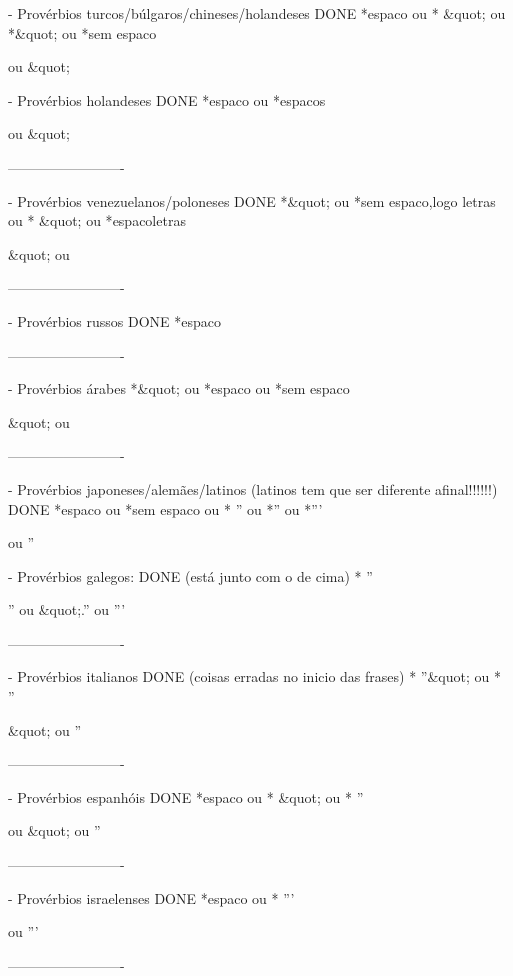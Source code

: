 - Provérbios turcos/búlgaros/chineses/holandeses                DONE
*{espaco} ou * &quot; ou *&quot; ou *{sem espaco}

\n ou &quot;

- Provérbios holandeses                                         DONE
*{espaco} ou *{espacos}

\n ou &quot;


-------------------------


- Provérbios venezuelanos/poloneses                                       DONE
*&quot; ou *{sem espaco,logo letras} ou * &quot; ou *{espaco}{letras}

&quot; ou \n


-------------------------


- Provérbios russos                                                      DONE
*{espaco}

\n


-------------------------


- Provérbios árabes
*&quot; ou *{espaco} ou *{sem espaco}

&quot; ou \n


-------------------------


- Provérbios japoneses/alemães/latinos (latinos tem que ser diferente afinal!!!!!!)        DONE
*{espaco} ou *{sem espaco} ou * '' ou *'' ou *'''

\n ou ''\n

- Provérbios galegos:                                                    DONE (está junto com o de cima)
* ''

'' ou &quot;.'' ou '''


-------------------------


- Provérbios italianos                                                   DONE (coisas erradas no inicio das frases)
* ''&quot; ou * ''

&quot; ou ''\n


-------------------------


- Provérbios espanhóis                                                   DONE
*{espaco} ou * &quot; ou * ''

\n ou &quot; ou ''\n


-------------------------


- Provérbios israelenses                                                 DONE
*{espaco} ou * '''

\n ou '''\n


-------------------------


